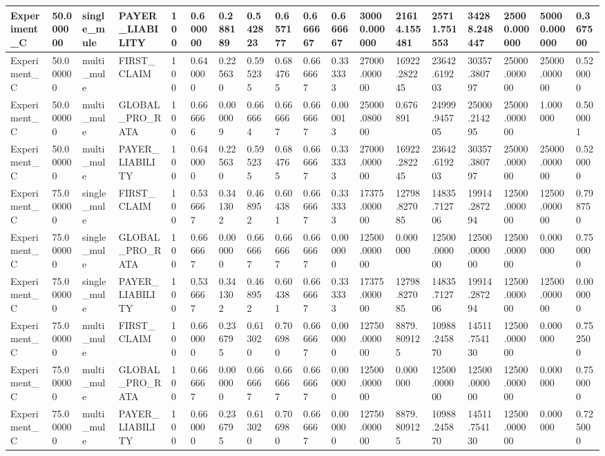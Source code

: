 \begin{tabular}{|l|l|l|l|l|l|l|l|l|l|l|l|l|l|l|l|l|l|}
Experiment\_C & 50.000000 & single\_mule & PAYER\_LIABILITY & 100 & 0.600000 & 0.288189 & 0.542823 & 0.657177 & 0.666667 & 0.666667 & 30000.000000 & 21614.155481 & 25711.751553 & 34288.248447 & 25000.000000 & 50000.000000 & 0.367500 \\ \hline
Experiment\_C & 50.000000 & multi\_mule & FIRST\_CLAIM & 100 & 0.640000 & 0.225630 & 0.595235 & 0.684765 & 0.666667 & 0.333333 & 27000.000000 & 16922.282245 & 23642.619203 & 30357.380797 & 25000.000000 & 25000.000000 & 0.520000 \\ \hline
Experiment\_C & 50.000000 & multi\_mule & GLOBAL\_PRO\_RATA & 100 & 0.666666 & 0.000009 & 0.666664 & 0.666667 & 0.666667 & 0.000013 & 25000.080000 & 0.676891 & 24999.945705 & 25000.214295 & 25000.000000 & 1.000000 & 0.500001 \\ \hline
Experiment\_C & 50.000000 & multi\_mule & PAYER\_LIABILITY & 100 & 0.640000 & 0.225630 & 0.595235 & 0.684765 & 0.666667 & 0.333333 & 27000.000000 & 16922.282245 & 23642.619203 & 30357.380797 & 25000.000000 & 25000.000000 & 0.520000 \\ \hline
Experiment\_C & 75.000000 & single\_mule & FIRST\_CLAIM & 100 & 0.536667 & 0.341302 & 0.468952 & 0.604381 & 0.666667 & 0.333333 & 17375.000000 & 12798.827085 & 14835.712706 & 19914.287294 & 12500.000000 & 12500.000000 & 0.798750 \\ \hline
Experiment\_C & 75.000000 & single\_mule & GLOBAL\_PRO\_RATA & 100 & 0.666667 & 0.000000 & 0.666667 & 0.666667 & 0.666667 & 0.000000 & 12500.000000 & 0.000000 & 12500.000000 & 12500.000000 & 12500.000000 & 0.000000 & 0.750000 \\ \hline
Experiment\_C & 75.000000 & single\_mule & PAYER\_LIABILITY & 100 & 0.536667 & 0.341302 & 0.468952 & 0.604381 & 0.666667 & 0.333333 & 17375.000000 & 12798.827085 & 14835.712706 & 19914.287294 & 12500.000000 & 12500.000000 & 0.000000 \\ \hline
Experiment\_C & 75.000000 & multi\_mule & FIRST\_CLAIM & 100 & 0.660000 & 0.236795 & 0.613020 & 0.706980 & 0.666667 & 0.000000 & 12750.000000 & 8879.809125 & 10988.245870 & 14511.754130 & 12500.000000 & 0.000000 & 0.752500 \\ \hline
Experiment\_C & 75.000000 & multi\_mule & GLOBAL\_PRO\_RATA & 100 & 0.666667 & 0.000000 & 0.666667 & 0.666667 & 0.666667 & 0.000000 & 12500.000000 & 0.000000 & 12500.000000 & 12500.000000 & 12500.000000 & 0.000000 & 0.750000 \\ \hline
Experiment\_C & 75.000000 & multi\_mule & PAYER\_LIABILITY & 100 & 0.660000 & 0.236795 & 0.613020 & 0.706980 & 0.666667 & 0.000000 & 12750.000000 & 8879.809125 & 10988.245870 & 14511.754130 & 12500.000000 & 0.000000 & 0.725000 \\ \hline

\end{tabular}
